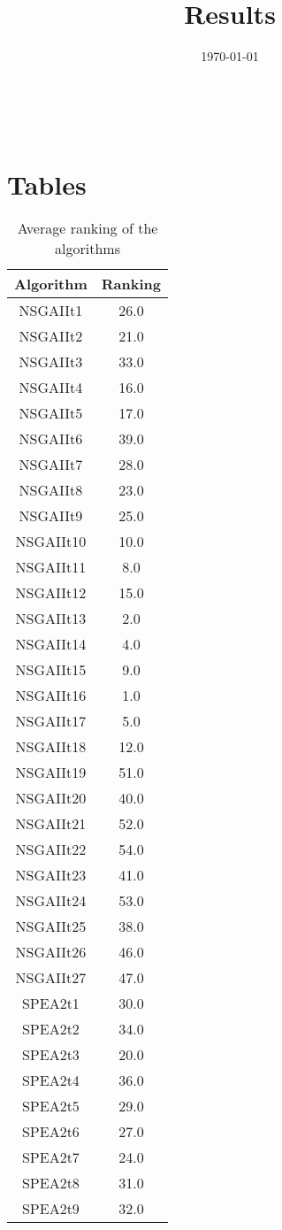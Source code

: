 \documentclass{article}
\title{Results}
\author{}
\date{\today}
\begin{document}
\oddsidemargin 0in \topmargin 0in\maketitle
\
\section{Tables}
\begin{table}[!htp]
\centering
\caption{Average ranking of the algorithms}
\begin{tabular}{c|c}
Algorithm&Ranking\\
\hline
NSGAIIt1&26.0\\
NSGAIIt2&21.0\\
NSGAIIt3&33.0\\
NSGAIIt4&16.0\\
NSGAIIt5&17.0\\
NSGAIIt6&39.0\\
NSGAIIt7&28.0\\
NSGAIIt8&23.0\\
NSGAIIt9&25.0\\
NSGAIIt10&10.0\\
NSGAIIt11&8.0\\
NSGAIIt12&15.0\\
NSGAIIt13&2.0\\
NSGAIIt14&4.0\\
NSGAIIt15&9.0\\
NSGAIIt16&1.0\\
NSGAIIt17&5.0\\
NSGAIIt18&12.0\\
NSGAIIt19&51.0\\
NSGAIIt20&40.0\\
NSGAIIt21&52.0\\
NSGAIIt22&54.0\\
NSGAIIt23&41.0\\
NSGAIIt24&53.0\\
NSGAIIt25&38.0\\
NSGAIIt26&46.0\\
NSGAIIt27&47.0\\
SPEA2t1&30.0\\
SPEA2t2&34.0\\
SPEA2t3&20.0\\
SPEA2t4&36.0\\
SPEA2t5&29.0\\
SPEA2t6&27.0\\
SPEA2t7&24.0\\
SPEA2t8&31.0\\
SPEA2t9&32.0\\

\end{tabular}
\end{table}
\end{document}
